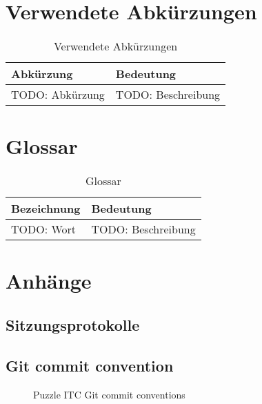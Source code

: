 \chapter{Verwendete Abkürzungen}

\begin{table}[H]
    \begin{tabular}{|L{0.3\textwidth}|L{0.6\textwidth}|}
        \hline
         \textbf{\color{white}Abkürzung} & \textbf{\color{white}Bedeutung} \\[12pt]
        \hline
        TODO: Abkürzung & TODO: Beschreibung \\
        \hline
    \end{tabular}
    \caption{Verwendete Abkürzungen}
\end{table}

\chapter{Glossar}

\begin{table}[H]
    \begin{tabular}{|L{0.3\textwidth}|L{0.6\textwidth}|}
        \hline
         \textbf{\color{white}Bezeichnung} & \textbf{\color{white}Bedeutung} \\[12pt]
        \hline
        TODO: Wort & TODO: Beschreibung \\
        \hline
    \end{tabular}
    \caption{Glossar}
\end{table}

\chapter{Anhänge}

\section{Sitzungsprotokolle}

\section{Git commit convention}
\label{sec:gitconv}
\begin{figure}[h]
    \centering
    \caption{Puzzle ITC Git commit conventions}
    \end{figure}

